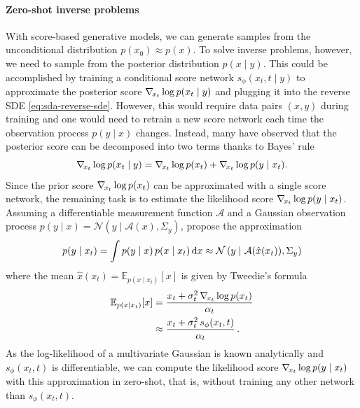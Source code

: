 \paragraph{Zero-shot inverse problems}
With score-based generative models, we can generate samples from the unconditional distribution $p(x_0) \approx p(x)$. To solve inverse problems, however, we need to sample from the posterior distribution $p(x \mid y)$. This could be accomplished by training a conditional score network $s_\phi(x_t, t \mid y)$ to approximate the posterior score $\nabla_{\!{x_t}} \log p(x_t \mid y)$ and plugging it into the reverse SDE \eqref{eq:sda-reverse-sde}. However, this would require data pairs $(x, y)$ during training and one would need to retrain a new score network each time the observation process $p(y \mid x)$ changes. Instead, many have observed \cite{song2021scorebased, kawar2021snips, song2022solving, adam2022posterior, chung2023diffusion} that the posterior score can be decomposed into two terms thanks to Bayes' rule
\begin{equation} \label{eq:sda-score-bayes}
    \nabla_{\!{x_t}} \log p(x_t \mid y) = \nabla_{\!{x_t}} \log p(x_t) + \nabla_{\!{x_t}} \log p(y \mid x_t) .
\end{equation}
Since the prior score $\nabla_{\!{x_t}} \log p(x_t)$ can be approximated with a single score network, the remaining task is to estimate the likelihood score $\nabla_{\!{x_t}} \log p(y \mid x_t)$. Assuming a differentiable measurement function $\mathcal{A}$ and a Gaussian observation process $p(y \mid x) = \mathcal{N}(y \mid \mathcal{A}(x), \Sigma_y)$, \textcite{chung2023diffusion} propose the approximation
\begin{equation} \label{eq:sda-likelihood-approx-dps}
    p(y \mid x_t) = \int p(y \mid x) \, p(x \mid x_t) \operatorname{d}\!{x} \approx \mathcal{N} \left(y \mid \mathcal{A}(\hat{x}(x_t)), \Sigma_y \right)
\end{equation}
where the mean $\hat{x}(x_t) = \mathbb{E}_{p(x \mid x_t)} [x]$ is given by Tweedie's formula \cite{efron2011tweedies, kim2021noise2score}
\begin{align}
    \mathbb{E}_{p(x \mid x_t)} [x] & = \frac{x_t + \sigma_t^2 \, \nabla_{\!{x_t}} \log p(x_t)}{\alpha_t} \label{eq:sda-tweedie} \\
    & \approx \frac{x_t + \sigma_t^2 \, s_\phi(x_t, t)}{\alpha_t} \, .
\end{align}
As the log-likelihood of a multivariate Gaussian is known analytically and $s_\phi(x_t, t)$ is differentiable, we can compute the likelihood score $\nabla_{\!{x_t}} \log p(y \mid x_t)$ with this approximation in zero-shot, that is, without training any other network than $s_\phi(x_t, t)$.

